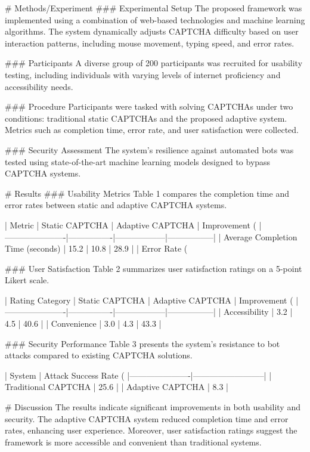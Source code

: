 # Methods/Experiment  
### Experimental Setup  
The proposed framework was implemented using a combination of web-based technologies and machine learning algorithms. The system dynamically adjusts CAPTCHA difficulty based on user interaction patterns, including mouse movement, typing speed, and error rates.

### Participants  
A diverse group of 200 participants was recruited for usability testing, including individuals with varying levels of internet proficiency and accessibility needs.

### Procedure  
Participants were tasked with solving CAPTCHAs under two conditions: traditional static CAPTCHAs and the proposed adaptive system. Metrics such as completion time, error rate, and user satisfaction were collected.

### Security Assessment  
The system's resilience against automated bots was tested using state-of-the-art machine learning models designed to bypass CAPTCHA systems.

# Results  
### Usability Metrics  
Table 1 compares the completion time and error rates between static and adaptive CAPTCHA systems.

| Metric               | Static CAPTCHA | Adaptive CAPTCHA | Improvement (%
|----------------------|----------------|------------------|-----------------|
| Average Completion Time (seconds) | 15.2            | 10.8             | 28.9            |
| Error Rate (%

### User Satisfaction  
Table 2 summarizes user satisfaction ratings on a 5-point Likert scale.

| Rating Category      | Static CAPTCHA | Adaptive CAPTCHA | Improvement (%
|----------------------|----------------|------------------|-----------------|
| Accessibility        | 3.2            | 4.5              | 40.6            |
| Convenience          | 3.0            | 4.3              | 43.3            |

### Security Performance  
Table 3 presents the system's resistance to bot attacks compared to existing CAPTCHA solutions.

| System               | Attack Success Rate (%
|----------------------|--------------------------|
| Traditional CAPTCHA | 25.6                     |
| Adaptive CAPTCHA    | 8.3                      |

# Discussion  
The results indicate significant improvements in both usability and security. The adaptive CAPTCHA system reduced completion time and error rates, enhancing user experience. Moreover, user satisfaction ratings suggest the framework is more accessible and convenient than traditional systems.

